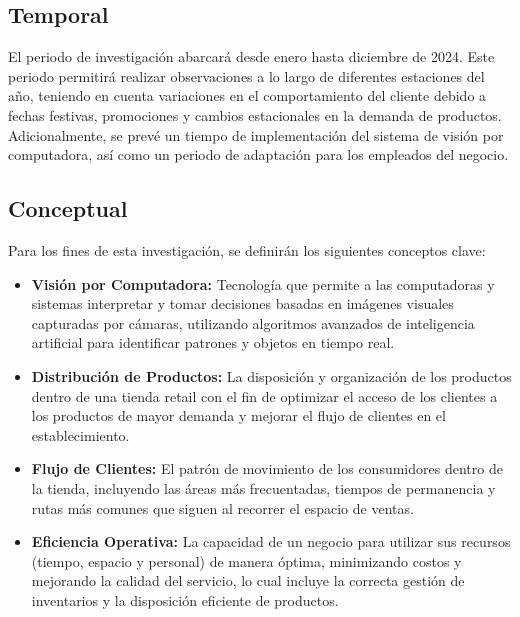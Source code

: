 \subsection{Temporal}
El periodo de investigación abarcará desde enero hasta diciembre de 2024. Este periodo permitirá realizar observaciones a lo largo de diferentes estaciones del año, teniendo en cuenta variaciones en el comportamiento del cliente debido a fechas festivas, promociones y cambios estacionales en la demanda de productos. Adicionalmente, se prevé un tiempo de implementación del sistema de visión por computadora, así como un periodo de adaptación para los empleados del negocio.

\subsection{Conceptual}
Para los fines de esta investigación, se definirán los siguientes conceptos clave:
\begin{itemize}
    \item \textbf{Visión por Computadora:} Tecnología que permite a las computadoras y sistemas interpretar y tomar decisiones basadas en imágenes visuales capturadas por cámaras, utilizando algoritmos avanzados de inteligencia artificial para identificar patrones y objetos en tiempo real.
    \item \textbf{Distribución de Productos:} La disposición y organización de los productos dentro de una tienda retail con el fin de optimizar el acceso de los clientes a los productos de mayor demanda y mejorar el flujo de clientes en el establecimiento.
    \item \textbf{Flujo de Clientes:} El patrón de movimiento de los consumidores dentro de la tienda, incluyendo las áreas más frecuentadas, tiempos de permanencia y rutas más comunes que siguen al recorrer el espacio de ventas.
    \item \textbf{Eficiencia Operativa:} La capacidad de un negocio para utilizar sus recursos (tiempo, espacio y personal) de manera óptima, minimizando costos y mejorando la calidad del servicio, lo cual incluye la correcta gestión de inventarios y la disposición eficiente de productos.
\end{itemize}



